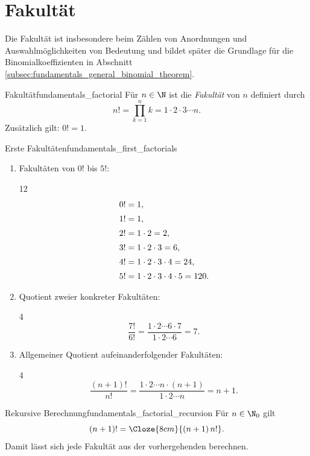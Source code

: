 \section{Fakultät}
\label{sec:fundamentals_factorial}

Die Fakultät ist insbesondere beim Zählen von Anordnungen und
Auswahlmöglichkeiten von Bedeutung und bildet später die Grundlage für die
Binomialkoeffizienten in Abschnitt \ref{subsec:fundamentals_general_binomial_theorem}.

\begin{DefinitionBox}{Fakultät}{fundamentals_factorial}
  Für $n\in\N$ ist die \emph{Fakultät}  von $n$
  definiert durch
  \[
    n!=\prod_{k=1}^{n}k=1\cdot2\cdot3\cdots n.
  \]
  Zusätzlich gilt: $0!=1.$
\end{DefinitionBox}

\begin{ExampleBox}{Erste Fakultäten}{fundamentals_first_factorials}
  \begin{enumerate}[label=(\alph*),leftmargin=2em,itemsep=0.8em]
    \item Fakultäten von $0!$ bis $5!$:
      \begin{ClozeArea}[28]{12}
        \[
          \begin{array}{r@{\;}c@{\;}l}
            0!&=&1,\\[0.5em]
            1!&=&1,\\[0.5em]
            2!&=&1\cdot2=2,\\[0.5em]
            3!&=&1\cdot2\cdot3=6,\\[0.5em]
            4!&=&1\cdot2\cdot3\cdot4=24,\\[0.5em]
            5!&=&1\cdot2\cdot3\cdot4\cdot5=120.
          \end{array}
        \]
      \end{ClozeArea}

    \item Quotient zweier konkreter Fakultäten:
      \begin{ClozeArea}[28]{4}
        \[
          \frac{7!}{6!}
            =\frac{1\cdot2\cdots6\cdot7}{1\cdot2\cdots6}
            =7.
        \]
      \end{ClozeArea}

    \item Allgemeiner Quotient aufeinanderfolgender Fakultäten:
      \begin{ClozeArea}[28]{4}
        \[
          \frac{(n+1)!}{n!}
            =\frac{1\cdot2\cdots n\cdot(n+1)}{1\cdot2\cdots n}
            =n+1.
        \]
      \end{ClozeArea}
  \end{enumerate}
\end{ExampleBox}

\begin{KeyPointBox}{Rekursive Berechnung}{fundamentals_factorial_recursion}
  Für $n\in\N_0$ gilt
  \[
    (n+1)!=\Cloze{8cm}{(n+1)\,n!}.
  \]
  Damit lässt sich jede Fakultät aus der vorhergehenden berechnen.
\end{KeyPointBox}
